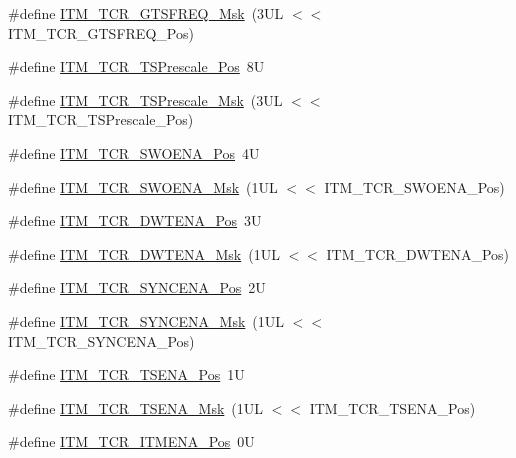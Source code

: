 \begin{DoxyCompactItemize}
\item 
\#define \hyperlink{group___c_m_s_i_s___i_t_m_gade862cf009827f7f6748fc44c541b067}{I\-T\-M\-\_\-\-T\-C\-R\-\_\-\-G\-T\-S\-F\-R\-E\-Q\-\_\-\-Msk}~(3\-U\-L $<$$<$ I\-T\-M\-\_\-\-T\-C\-R\-\_\-\-G\-T\-S\-F\-R\-E\-Q\-\_\-\-Pos)
\item 
\#define \hyperlink{group___c_m_s_i_s___i_t_m_gad7bc9ee1732032c6e0de035f0978e473}{I\-T\-M\-\_\-\-T\-C\-R\-\_\-\-T\-S\-Prescale\-\_\-\-Pos}~8\-U
\item 
\#define \hyperlink{group___c_m_s_i_s___i_t_m_ga7a723f71bfb0204c264d8dbe8cc7ae52}{I\-T\-M\-\_\-\-T\-C\-R\-\_\-\-T\-S\-Prescale\-\_\-\-Msk}~(3\-U\-L $<$$<$ I\-T\-M\-\_\-\-T\-C\-R\-\_\-\-T\-S\-Prescale\-\_\-\-Pos)
\item 
\#define \hyperlink{group___c_m_s_i_s___i_t_m_ga7a380f0c8078f6560051406583ecd6a5}{I\-T\-M\-\_\-\-T\-C\-R\-\_\-\-S\-W\-O\-E\-N\-A\-\_\-\-Pos}~4\-U
\item 
\#define \hyperlink{group___c_m_s_i_s___i_t_m_ga97476cb65bab16a328b35f81fd02010a}{I\-T\-M\-\_\-\-T\-C\-R\-\_\-\-S\-W\-O\-E\-N\-A\-\_\-\-Msk}~(1\-U\-L $<$$<$ I\-T\-M\-\_\-\-T\-C\-R\-\_\-\-S\-W\-O\-E\-N\-A\-\_\-\-Pos)
\item 
\#define \hyperlink{group___c_m_s_i_s___i_t_m_ga30e83ebb33aa766070fe3d1f27ae820e}{I\-T\-M\-\_\-\-T\-C\-R\-\_\-\-D\-W\-T\-E\-N\-A\-\_\-\-Pos}~3\-U
\item 
\#define \hyperlink{group___c_m_s_i_s___i_t_m_ga98ea1c596d43d3633a202f9ee746cf70}{I\-T\-M\-\_\-\-T\-C\-R\-\_\-\-D\-W\-T\-E\-N\-A\-\_\-\-Msk}~(1\-U\-L $<$$<$ I\-T\-M\-\_\-\-T\-C\-R\-\_\-\-D\-W\-T\-E\-N\-A\-\_\-\-Pos)
\item 
\#define \hyperlink{group___c_m_s_i_s___i_t_m_gaa93a1147a39fc63980d299231252a30e}{I\-T\-M\-\_\-\-T\-C\-R\-\_\-\-S\-Y\-N\-C\-E\-N\-A\-\_\-\-Pos}~2\-U
\item 
\#define \hyperlink{group___c_m_s_i_s___i_t_m_gac89b74a78701c25b442105d7fe2bbefb}{I\-T\-M\-\_\-\-T\-C\-R\-\_\-\-S\-Y\-N\-C\-E\-N\-A\-\_\-\-Msk}~(1\-U\-L $<$$<$ I\-T\-M\-\_\-\-T\-C\-R\-\_\-\-S\-Y\-N\-C\-E\-N\-A\-\_\-\-Pos)
\item 
\#define \hyperlink{group___c_m_s_i_s___i_t_m_ga5aa381845f810114ab519b90753922a1}{I\-T\-M\-\_\-\-T\-C\-R\-\_\-\-T\-S\-E\-N\-A\-\_\-\-Pos}~1\-U
\item 
\#define \hyperlink{group___c_m_s_i_s___i_t_m_ga436b2e8fa24328f48f2da31c00fc9e65}{I\-T\-M\-\_\-\-T\-C\-R\-\_\-\-T\-S\-E\-N\-A\-\_\-\-Msk}~(1\-U\-L $<$$<$ I\-T\-M\-\_\-\-T\-C\-R\-\_\-\-T\-S\-E\-N\-A\-\_\-\-Pos)
\item 
\#define \hyperlink{group___c_m_s_i_s___i_t_m_ga3286b86004bce7ffe17ee269f87f8d9d}{I\-T\-M\-\_\-\-T\-C\-R\-\_\-\-I\-T\-M\-E\-N\-A\-\_\-\-Pos}~0\-U

\end{DoxyCompactItemize}

